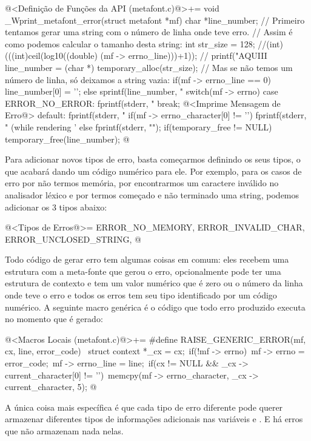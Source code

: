 \iniciocodigo
@<Definição de Funções da API (metafont.c)@>+=
void _Wprint_metafont_error(struct metafont *mf){
  char *line_number;
  // Primeiro tentamos gerar uma string com o número de linha onde teve erro.
  // Assim é como podemos calcular o tamanho desta string:
  int str_size = 128;
  //(int)(((int)ceil(log10((double) (mf -> errno_line)))+1));
  //          printf("AQUIII %
  line_number = (char *) temporary_alloc(str_size);
  // Mas se não temos um número de linha, só deixamos a string vazia:
  if(mf -> errno_line == 0)
    line_number[0] = '\0';
  else
    sprintf(line_number, "%
  switch(mf -> errno){
  case ERROR_NO_ERROR:
    fprintf(stderr, "%
    break;
  @<Imprime Mensagem de Erro@>
  default:
    fprintf(stderr, "%
  }
  if(mf -> errno_character[0] != '\0'){
    fprintf(stderr, " (while rendering '%
  }
  else
    fprintf(stderr, "\n");
  if(temporary_free != NULL)
    temporary_free(line_number);
}
@
\fimcodigo

Para adicionar novos tipos de erro, basta começarmos definindo os seus
tipos, o que acabará dando um código numérico para ele. Por exemplo,
para os casos de erro por não termos memória, por encontrarmos um caractere
inválido no analisador léxico e por termos começado e não terminado
uma string, podemos adicionar os 3 tipos abaixo:

\iniciocodigo
@<Tipos de Erros@>=
ERROR_NO_MEMORY, ERROR_INVALID_CHAR, ERROR_UNCLOSED_STRING,
@
\fimcodigo

Todo código de gerar erro tem algumas coisas em comum: eles recebem
uma estrutura com a meta-fonte que gerou o erro, opcionalmente pode
ter uma estrutura de contexto e tem um valor numérico que é zero ou o
número da linha onde teve o erro e todos os erros tem seu tipo
identificado por um código numérico. A seguinte macro genérica é o
código que todo erro produzido executa no momento que é gerado:

\iniciocodigo
@<Macros Locais (metafont.c)@>+=
#define RAISE_GENERIC_ERROR(mf, cx, line, error_code) {\
  struct context *_cx = cx;\
  if(!mf -> errno){\
    mf -> errno = error_code;\
    mf -> errno_line = line;\
    if(cx != NULL && _cx -> current_character[0] != '\0')\
      memcpy(mf -> errno_character, _cx -> current_character, 5);}}
@
\fimcodigo

A única coisa mais específica é que cada tipo de erro diferente pode
querer armazenar diferentes tipos de informações adicionais nas
variáveis \monoespaco{errno\_str} e \monoespaco{errno\_int}. E há
erros que não armazenam nada nelas.

